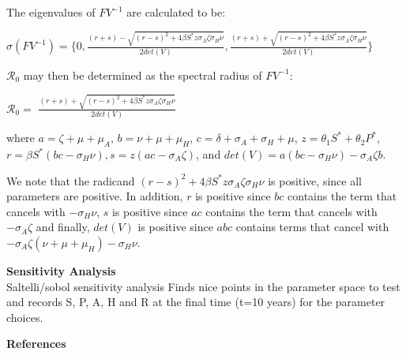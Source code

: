 \documentclass[12pt]{article}
\begin{document}
The eigenvalues of $FV^{-1}$ are calculated to be: 
\begin{center}
$\sigma (FV^{-1}) = \{0, \frac{(r+s)-\sqrt{(r-s)^2+4\beta S^* z  \sigma_A \zeta \sigma_H \nu}}{2det(V)} 
, \frac{(r+s)+\sqrt{(r-s)^2+4\beta S^* z  \sigma_A \zeta \sigma_H \nu}}{2det(V)} 
\}$
\end{center}

$\mathscr{R}_0$ may then be determined as the spectral radius of $FV^{-1}$:
\begin{center}
$\mathscr{R}_0=$ $\frac{(r+s)+\sqrt{(r-s)^2+4\beta S^* z  \sigma_A \zeta \sigma_H \nu}}{2det(V)} $
\end{center}
where $a=\zeta +\mu + \mu_A$, $b=\nu + \mu + \mu_H$, $c=\delta + \sigma_A + \sigma_H +\mu$, $z=\theta_1 S^* + \theta_2 P^*$, $ r=\beta S^* (bc-\sigma_H \nu), s=z(ac-\sigma_{A} \zeta)$, and $det(V)=a(bc-\sigma_H\nu)-\sigma_A\zeta b$.

We note that the radicand $(r-s)^2+4\beta S^* z  \sigma_A \zeta \sigma_H \nu$ is positive, since all parameters are positive. In addition, $r$ is positive since $bc$ contains the term that cancels with $-\sigma_{H} \nu$,  $s$ is positive since $ac$ contains the term that cancels with $-\sigma_{A} \zeta$ and finally, $det(V)$ is positive since $abc$ contains terms that cancel with $-\sigma_A\zeta(\nu+\mu+\mu_H)-\sigma_H\nu$. 


\textbf{Sensitivity Analysis} \\
Saltelli/sobol sensitivity analysis 
Finds nice points in the parameter space to test and records S, P, A, H and R at the final time (t=10 years) for the parameter choices. 











\textbf{References}
\end{document}
